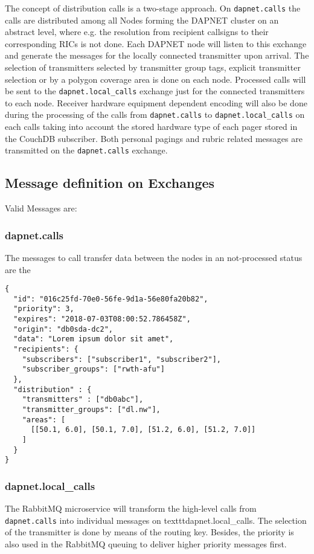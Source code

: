 The concept of distribution calls is a two-stage approach. On \texttt{dapnet.calls} the calls are distributed among all Nodes forming the DAPNET cluster on an abstract level, where e.g. the resolution from recipient callsigns to their corresponding RICs is not done. Each DAPNET node will listen to this exchange and generate the messages for the locally connected transmitter upon arrival. The selection of transmitters selected by transmitter group tags, explicit transmitter selection or by a polygon coverage area is done on each node. Processed calls will be sent to the \texttt{dapnet.local\_calls} exchange just for the connected transmitters to each node. Receiver hardware equipment dependent encoding will also be done during the processing of the calls from \texttt{dapnet.calls} to \texttt{dapnet.local\_calls} on each calls taking into account the stored hardware type of each pager stored in the CouchDB subscriber. Both personal pagings and rubric related messages are transmitted on the \texttt{dapnet.calls} exchange.


\subsection{Message definition on Exchanges}
\label{protocoldef:RabbitMQ:exchangesdifinition}


Valid Messages are:

\subsubsection{dapnet.calls}
\label{protocoldef:RabbitMQ:dapnet.calls}
The messages to call transfer data between the nodes in an not-processed status are the
\begin{lstlisting}
{
  "id": "016c25fd-70e0-56fe-9d1a-56e80fa20b82",
  "priority": 3,
  "expires": "2018-07-03T08:00:52.786458Z",
  "origin": "db0sda-dc2",
  "data": "Lorem ipsum dolor sit amet",
  "recipients": {
    "subscribers": ["subscriber1", "subscriber2"],
    "subscriber_groups": ["rwth-afu"]
  },
  "distribution" : {
    "transmitters" : ["db0abc"],
    "transmitter_groups": ["dl.nw"],
    "areas": [
      [[50.1, 6.0], [50.1, 7.0], [51.2, 6.0], [51.2, 7.0]]
    ]
  }
}
\end{lstlisting}

\subsubsection{dapnet.local\_calls}
\label{protocoldef:RabbitMQ:dapnet.local_calls}
The RabbitMQ microservice will transform the high-level calls from \texttt{dapnet.calls} into individual messages on texttt{dapnet.local\_calls}. The selection of the transmitter is done by means of the routing key. Besides, the priority is also used in the RabbitMQ queuing to deliver higher priority messages first.

